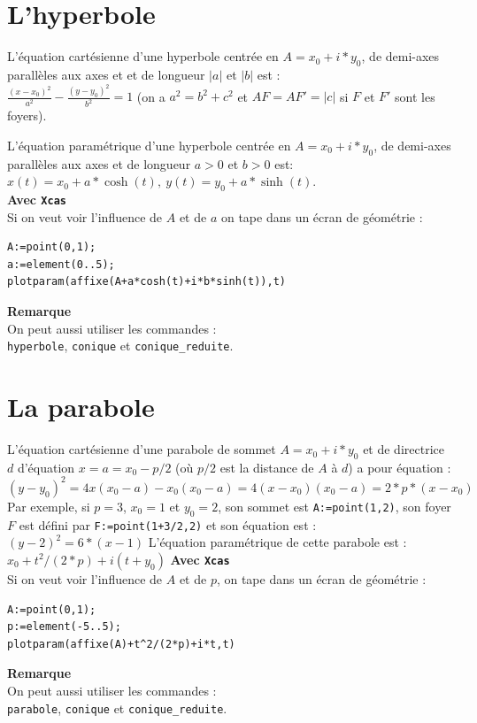 \documentclass[a4paper,11pt]{book}
\begin{document}
\section{L'hyperbole}
\noindent L'\'equation cart\'esienne d'une hyperbole centr\'ee en $A=x_0+i*y_0$,
de demi-axes parall\`eles aux axes et et de longueur  $|a|$ et $|b|$ est :\\
 $\frac{(x-x_0)^2}{a^2}-\frac{(y-y_0)^2}{b^2}=1$ (on a $a^2=b^2+c^2$ et 
$AF=AF'=|c|$ si $F$ et $F'$ sont les foyers).

L'\'equation param\'etrique d'une hyperbole centr\'ee en $A=x_0+i*y_0$, de 
demi-axes parall\`eles aux axes et de longueur $a>0$ et $b>0$ est:\\
 $x(t)=x_0+a*\cosh(t),\ y(t)=y_0+a*\sinh(t)$.\\
{\bf Avec {\tt Xcas}}\\
Si on veut voir l'influence de $A$ et de $a$ on tape dans un \'ecran de 
g\'eom\'etrie :
\begin{verbatim}
A:=point(0,1);
a:=element(0..5);
plotparam(affixe(A+a*cosh(t)+i*b*sinh(t)),t)
\end{verbatim}
{\bf Remarque}\\
On peut aussi utiliser les commandes :\\
{\tt hyperbole}, {\tt conique} et {\tt conique\_reduite}. 

\section{La parabole}
\noindent L'\'equation cart\'esienne d'une parabole de sommet $A=x_0+i*y_0$ et 
de directrice $d$ d'\'equation $x=a=x_0-p/2$ (o\`u $p/2$ est la distance de $A$
\`a $d$) a pour \'equation : \\
$(y-y_0)^2=4x(x_0-a)-x_0(x_0-a)=4(x-x_0)(x_0-a)=2*p*(x-x_0)$
Par exemple, si $p=3$, $x_0=1$ et $y_0=2$, son sommet est {\tt A:=point(1,2)}, 
son foyer $F$ est d\'efini par {\tt F:=point(1+3/2,2)} et son 
\'equation est :\\
$(y-2)^2=6*(x-1)$
L'\'equation param\'etrique de cette parabole est :\\
$x_0+t^2/(2*p)+i(t+y_0)$
{\bf Avec {\tt Xcas}}\\
Si on veut voir l'influence de $A$ et de $p$, on tape dans un \'ecran de 
g\'eom\'etrie :
\begin{verbatim}
A:=point(0,1);
p:=element(-5..5);
plotparam(affixe(A)+t^2/(2*p)+i*t,t)
\end{verbatim}
{\bf Remarque}\\
On peut aussi utiliser les commandes :\\
{\tt parabole}, {\tt conique} et {\tt conique\_reduite}. 
\end{document}
